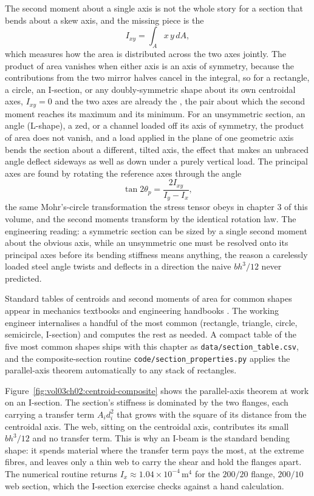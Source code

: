 The second moment about a single axis is not the whole story for a section
that bends about a skew axis, and the missing piece is the 
\[
I_{xy} = \int_A x\,y\,dA,
\]
which measures how the area is distributed across the two axes jointly.
The product of area vanishes when either axis is an axis of symmetry,
because the contributions from the two mirror halves cancel in the integral,
so for a rectangle, a circle, an I-section, or any doubly-symmetric shape
about its own centroidal axes, $I_{xy} = 0$ and the two axes are already the
, the pair about which the second moment reaches its
maximum and its minimum. For an unsymmetric section, an angle (L-shape), a
zed, or a channel loaded off its axis of symmetry, the product of area does
not vanish, and a load applied in the plane of one geometric axis bends the
section about a different, tilted axis, the effect that makes an unbraced
angle deflect sideways as well as down under a purely vertical load. The
principal axes are found by rotating the reference axes through the angle
\[
\tan 2\theta_p = \frac{2 I_{xy}}{I_y - I_x},
\]
the same Mohr's-circle transformation the stress tensor obeys in chapter 3
of this volume, and the second moments transform by the identical rotation
law. The engineering reading: a symmetric section can be sized by a single
second moment about the obvious axis, while an unsymmetric one must be
resolved onto its principal axes before its bending stiffness means
anything, the reason a carelessly loaded steel angle twists and deflects in
a direction the naive $bh^3/12$ never predicted.

Standard tables of centroids and second moments of area for common
shapes appear in mechanics textbooks and engineering handbooks
\cite[appendices]{text:meriam-kraige2018}. The working engineer
internalises a handful of the most common (rectangle, triangle,
circle, semicircle, I-section) and computes the rest as needed. A
compact table of the five most common shapes ships with this chapter
as \texttt{data/section\_table.csv}, and the composite-section routine
\texttt{code/section\_properties.py} applies the parallel-axis theorem
automatically to any stack of rectangles.



Figure~\ref{fig:vol03ch02:centroid-composite} shows the parallel-axis
theorem at work on an I-section. The section's stiffness is dominated by
the two flanges, each carrying a transfer term $A_i d_i^2$ that grows
with the square of its distance from the centroidal axis. The web,
sitting on the centroidal axis, contributes its small $bh^3/12$ and no
transfer term. This is why an I-beam is the standard bending shape: it
spends material where the transfer term pays the most, at the extreme
fibres, and leaves only a thin web to carry the shear and hold the
flanges apart. The numerical routine returns
$I_x \approx 1.04 \times 10^{-4}\,\si{\meter\tothe{4}}$ for the
$200/20$ flange, $200/10$ web section, which the I-section exercise
checks against a hand calculation.

